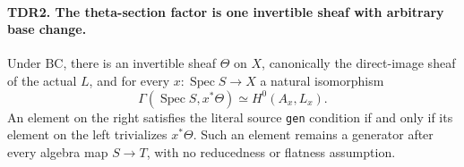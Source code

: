 \documentclass[11pt,a4paper]{article}
\numberwithin{equation}{section}
\theoremstyle{remark}\newtheorem{remark}[theorem]{Remark}
\begin{document}
\paragraph{TDR2. The theta-section factor is one invertible sheaf with arbitrary base change.}
\label{claim:TDR2}
Under \(\mathrm{BC}\), there is an invertible sheaf \(\Theta\) on
\(X\), canonically the direct-image sheaf of the actual \(L\), and
for every \(x:\operatorname{Spec}S\to X\) a natural isomorphism
\[
 \Gamma(\operatorname{Spec}S,x^*\Theta)
       \simeq H^0(A_x,L_x).                                 \tag{TDR.4}
\]
An element on the right satisfies the literal source \texttt{gen}
condition if and only if its element on the left trivializes
\(x^*\Theta\).  Such an element remains a generator after every
algebra map \(S\to T\), with no reducedness or flatness assumption.
\end{document}
